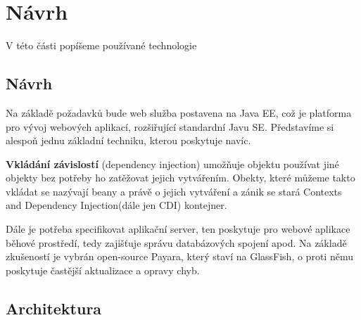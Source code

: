 \chapter{Návrh}  

V této části popíšeme používané technologie

\section{Návrh}
Na základě požadavků bude web služba postavena na Java EE, což je platforma pro vývoj webových aplikací, rozšiřující standardní Javu SE. Představíme si alespoň jednu základní techniku, kterou poskytuje navíc. 
\par
\textbf{Vkládání závislostí} (dependency injection) umožňuje objektu používat jiné objekty bez potřeby ho zatěžovat jejich vytvářením. Obekty, které můžeme takto vkládat se nazývají beany a právě o jejich vytváření a zánik se stará Contexts and Dependency Injection(dále jen CDI) kontejner.

Dále je potřeba specifikovat aplikační server, ten poskytuje pro webové aplikace běhové prostředí, tedy zajišťuje správu databázových spojení apod. Na základě zkušeností je vybrán open-source Payara, který staví na GlassFish, o proti němu poskytuje častější aktualizace a opravy chyb. 



\section{Architektura}

